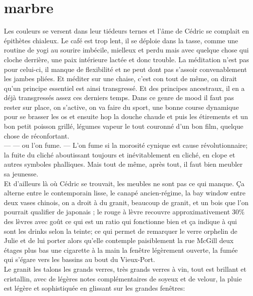 \clearpage
\section*{marbre}
Les couleurs se versent dans leur tiédeurs ternes et
l'âme de Cédric se complait en épithètes chialeux. Le café est trop lent, il se
déploie dans la tasse, comme une routine de yogi au sourire imbécile, mielleux
et perdu mais avec quelque chose qui cloche derrière, une paix intérieure lactée
et donc trouble. La méditation n'est pas pour celui-ci, il manque de flexibilité
et ne peut dont pas s'assoir convenablement les jambes pliées.  Et méditer sur
une chaise, c'est con tout de même, on dirait qu'un principe essentiel est ainsi
transgressé. Et des principes ancestraux, il en a déjà transgressés assez ces
derniers temps.  Dans ce genre de mood il faut pas rester sur place, on
s'active, on va faire du sport, une bonne course dynamique pour se brasser les
os et ensuite hop la douche chaude et puis les étirements et un bon petit
poisson grillé, légumes vapeur le tout couronné d'un bon film, quelque chose de
réconfortant.  \\--- --- ou l'on fume. --- L'on fume si la morosité cynique est
cause révolutionnaire; la fuite du cliché aboutissant toujours et
inévitablement en cliché, en  clope et autres symboles phalliques.  Mais
tout de même, après tout, il faut bien meubler sa jeunesse. \\

Et d'ailleurs là où Cédric se trouvait, les meubles ne sont pas ce qui manque.
Ça alterne entre le contemporain lisse, le canapé ancien-régime, la bay window
entre deux vases chinois, on a droit à du granit, beaucoup de granit, et un bois
que l'on pourrait qualifier de japonais ; le rouge à lèvre recouvre
approximativement 30\% des lèvres avec goût ce qui est un ratio qui fonctionne
bien et ça indique à qui sont les drinks selon la teinte; ce qui permet de
remarquer le verre orphelin de Julie et de lui porter alors qu'elle contemple
paisiblement la rue McGill deux étages plus bas une cigarette à la main la
fenêtre légèrement ouverte, la fumée qui s'égare vers les bassins au bout du Vieux-Port. 
\\Le granit les talons les grands verres, très grands verres à vin, tout est
brillant et cristallin, avec de légères notes complémentaires de soyeux et de
velour, la pluie est légère et sophistiquée en glissant sur les grandes
fenêtres:

